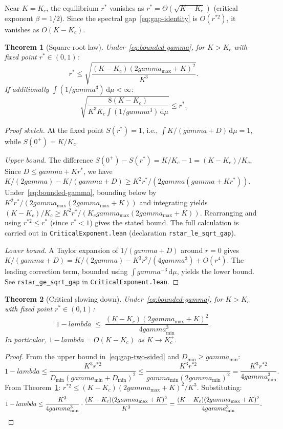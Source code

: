 \documentclass[11pt,a4paper]{article}
\let\lambda\relax\def\lambda{lambda}%
\let\gamma\relax\def\gamma{gamma}%
\newtheorem{theorem}{Theorem}[section]
\theoremstyle{definition}
\begin{document}
Near $K = K_c$, the equilibrium $r^*$ vanishes as $r^* = \Theta(\sqrt{K - K_c})$ (critical exponent $\beta = 1/2$). Since the spectral gap~\eqref{eq:gap-identity} is $O(r^{*2})$, it vanishes as $O(K - K_c)$.

\begin{theorem}[Square-root law]\label{thm:rstar-bounds}
Under~\eqref{eq:bounded-gamma}, for $K > K_c$ with fixed point $r^* \in (0,1)$:
\[
r^* \leq \sqrt{\frac{(K - K_c)(2\gamma_{\max} + K)^2}{K^3}}.
\]
If additionally $\int (1/\gamma^3)\,\mathrm{d}\mu < \infty$:
\[
\sqrt{\frac{8(K - K_c)}{K^3 K_c \int (1/\gamma^3)\,\mathrm{d}\mu}} \leq r^*.
\]
\end{theorem}

\begin{proof}[Proof sketch]
At the fixed point $S(r^*)=1$, i.e., $\int K/(\gamma+D)\,\mathrm{d}\mu = 1$, while $S(0^+)=K/K_c$.

\emph{Upper bound.} The difference $S(0^+)-S(r^*) = K/K_c - 1 = (K-K_c)/K_c$. Since $D\leq\gamma+Kr^*$, we have $K/(2\gamma) - K/(\gamma+D) \geq K^2r^*/(2\gamma(\gamma+Kr^*))$. Under~\eqref{eq:bounded-gamma}, bounding below by $K^2r^*/(2\gamma_{\max}(2\gamma_{\max}+K))$ and integrating yields $(K-K_c)/K_c \geq K^2 r^*/(K_c\gamma_{\max}(2\gamma_{\max}+K))$. Rearranging and using $r^{*2} \leq r^*$ (since $r^*<1$) gives the stated bound. The full calculation is carried out in \texttt{CriticalExponent.lean} (declaration \texttt{rstar\_le\_sqrt\_gap}).

\emph{Lower bound.} A Taylor expansion of $1/(\gamma+D)$ around $r=0$ gives $K/(\gamma+D) = K/(2\gamma) - K^3r^2/(4\gamma^3) + O(r^4)$. The leading correction term, bounded using $\int\gamma^{-3}\,\mathrm{d}\mu$, yields the lower bound. See \texttt{rstar\_ge\_sqrt\_gap} in \texttt{CriticalExponent.lean}.
\end{proof}

\begin{theorem}[Critical slowing down]\label{thm:csd}
Under~\eqref{eq:bounded-gamma}, for $K > K_c$ with fixed point $r^* \in (0,1)$:
\begin{equation}\label{eq:csd}
1 - \lambda \;\leq\; \frac{(K - K_c)(2\gamma_{\max} + K)^2}{4\gamma_{\min}^3}.
\end{equation}
In particular, $1 - \lambda = O(K - K_c)$ as $K \to K_c^+$.
\end{theorem}

\begin{proof}
From the upper bound in~\eqref{eq:gap-two-sided} and $D_{\min} \geq \gamma_{\min}$:
\[
1 - \lambda \leq \frac{K^3 r^{*2}}{D_{\min}(\gamma_{\min} + D_{\min})^2} \leq \frac{K^3 r^{*2}}{\gamma_{\min} (2\gamma_{\min})^2} = \frac{K^3 r^{*2}}{4\gamma_{\min}^3}.
\]
From Theorem~\ref{thm:rstar-bounds}: $r^{*2} \leq (K - K_c)(2\gamma_{\max} + K)^2/K^3$. Substituting:
\[
1 - \lambda \leq \frac{K^3}{4\gamma_{\min}^3} \cdot \frac{(K - K_c)(2\gamma_{\max} + K)^2}{K^3} = \frac{(K - K_c)(2\gamma_{\max} + K)^2}{4\gamma_{\min}^3}. \qedhere
\]
\end{proof}
\end{document}
